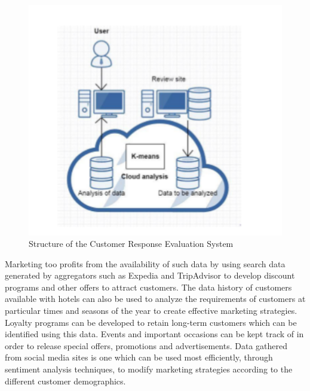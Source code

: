 \documentclass[sigconf]{acmart}
\begin{document}
\begin{figure}
	\includegraphics[width=\columnwidth]{images/evaluation_system.pdf}
	\caption{Structure of the Customer Response Evaluation System \cite {jianfangwang07}}
\end{figure}

Marketing too profits from the availability of such data by using search data generated by aggregators such as Expedia and TripAdvisor to develop discount programs and other offers to attract customers. The data history of customers available with hotels can also be used to analyze the requirements of customers at particular times and seasons of the year to create effective marketing strategies. Loyalty programs can be developed to retain long-term customers which can be identified using this data. Events and important occasions can be kept track of in order to release special offers, promotions and advertisements. Data gathered from social media sites is one which can be used most efficiently, through sentiment analysis techniques, to modify marketing strategies according to the different customer demographics.
\end{document}
